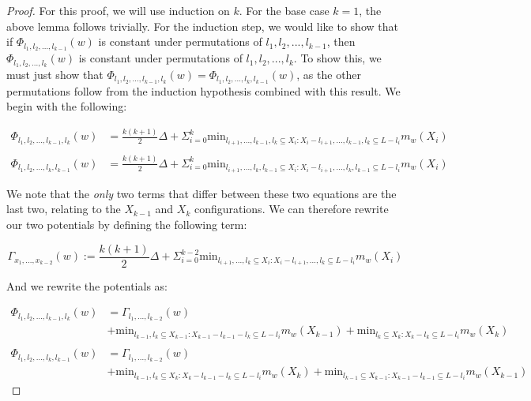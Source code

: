 \begin{proof}
    For this proof, we will use induction on $k$. For the base case $k=1$, the above lemma follows trivially. For the induction step, we would like to show that if $\Phi_{l_1, l_2, ..., l_{k-1}}(w)$ is constant under permutations of $l_1, l_2, ..., l_{k-1}$, then $\Phi_{l_1, l_2, ..., l_k}(w)$ is constant under permutations of $l_1, l_2, ..., l_k$. To show this, we must just show that $\Phi_{l_1, l_2, ..., l_{k-1}, l_k}(w) = \Phi_{l_1, l_2, ..., l_k, l_{k-1}}(w)$, as the other permutations follow from the induction hypothesis combined with this result. We begin with the following: 

    \begin{equation*}
        \begin{split}
            \Phi_{l_1, l_2, ..., l_{k-1}, l_k}(w) &= \frac{k(k+1)}{2} \Delta + \Sigma_{i=0}^k \mathrm{min}_{l_{i+1}, ..., l_{k-1}, l_k \subseteq X_i : X_i - l_{i+1}, ..., l_{k-1}, l_k \subseteq L - l_i} m_w(X_i) \\ \\
            \Phi_{l_1, l_2, ..., l_k, l_{k-1}}(w) &= \frac{k(k+1)}{2} \Delta + \Sigma_{i=0}^k \mathrm{min}_{l_{i+1}, ..., l_k, l_{k-1} \subseteq X_i : X_i - l_{i+1}, ..., l_k, l_{k-1} \subseteq L - l_i} m_w(X_i)
        \end{split}
    \end{equation*}

    We note that the \textit{only} two terms that differ between these two equations are the last two, relating to the $X_{k-1}$ and $X_k$ configurations. We can therefore rewrite our two potentials by defining the following term:
    
    \begin{equation*}
            \Gamma_{x_1, ..., x_{k-2}}(w) := \frac{k(k+1)}{2} \Delta + \Sigma_{i=0}^{k-2} \mathrm{min}_{l_{i+1}, ..., l_k \subseteq X_i : X_i - l_{i+1}, ..., l_k \subseteq L - l_i} m_w(X_i)
    \end{equation*}

    And we rewrite the potentials as: 

    \begin{equation*}
        \begin{split}
            \Phi_{l_1, l_2, ..., l_{k-1}, l_k}(w) &= \Gamma_{l_1, ..., l_{k-2}}(w) \\
            &+ \mathrm{min}_{l_{k-1}, l_k \subseteq X_{k-1} : X_{k-1} - l_{k-1} - l_k \subseteq L - l_i} m_w(X_{k-1}) +  \mathrm{min}_{l_k \subseteq X_k : X_k - l_k \subseteq L - l_i} m_w(X_{k}) \\ \\
            \Phi_{l_1, l_2, ..., l_{k}, l_{k-1}}(w) &= \Gamma_{l_1, ..., l_{k-2}}(w) \\
            &+ \mathrm{min}_{l_{k-1}, l_k \subseteq X_{k} : X_{k} - l_{k-1} - l_k \subseteq L - l_i} m_w(X_{k}) +  \mathrm{min}_{l_{k-1} \subseteq X_{k-1} : X_{k-1} - l_{k-1} \subseteq L - l_i} m_w(X_{k-1})
        \end{split}
    \end{equation*}
    

\end{proof}
